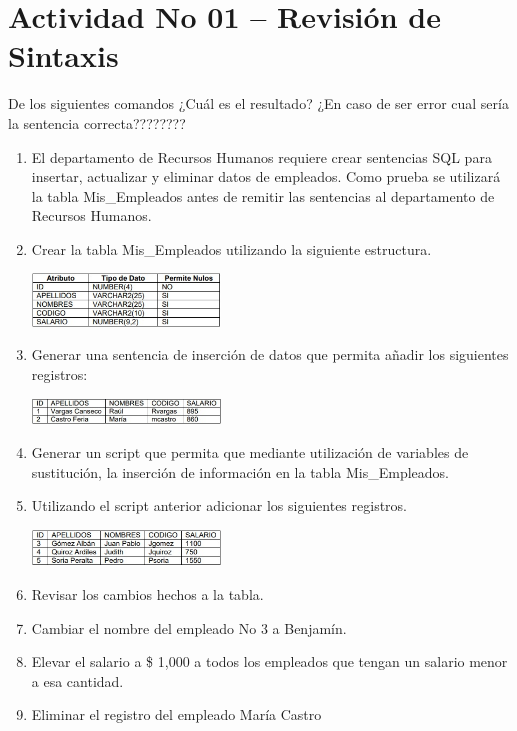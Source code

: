 \section{Actividad No 01 – Revisi\'on de Sintaxis} 
De los siguientes comandos ¿Cuál es el resultado? ¿En caso de ser error cual sería la sentencia correcta????????

\begin{enumerate}[1.]
	\item El departamento de Recursos Humanos requiere crear sentencias SQL para insertar, actualizar y eliminar datos de empleados. Como prueba se utilizará la tabla Mis\_Empleados antes de remitir las sentencias al departamento de Recursos Humanos.
	\item Crear la tabla Mis\_Empleados utilizando la siguiente estructura.
	\begin{center}
	\includegraphics[width=5cm]{./Imagenes/imagen0102} 
	\end{center}
	\item Generar una sentencia de inserción de datos que permita añadir los siguientes registros:
	\begin{center}
	\includegraphics[width=5cm]{./Imagenes/imagen0103} 
	\end{center}
	\item Generar un script que permita que mediante utilización de variables de sustitución, la inserción de información en la tabla Mis\_Empleados.
	\item Utilizando el script anterior adicionar los siguientes registros.
	\begin{center}
	\includegraphics[width=5cm]{./Imagenes/imagen0105} 
	\end{center}
	\item Revisar los cambios hechos a la tabla.
	\item Cambiar el nombre del empleado No 3 a Benjamín.
	\item Elevar el salario a \$ 1,000 a todos los empleados que tengan un salario menor a esa cantidad.
	\item Eliminar el registro del empleado María Castro

\end{enumerate}
